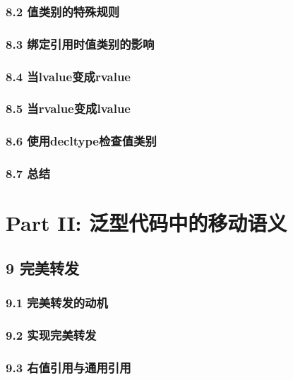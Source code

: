 \documentclass[11pt,a4paper,UTF8]{ctexart}
\begin{document}
		\subsubsection{8.2 值类别的特殊规则}
		
		\subsubsection{8.3 绑定引用时值类别的影响}
		
		\subsubsection{8.4 当lvalue变成rvalue}
		
		\subsubsection{8.5 当rvalue变成lvalue}
		
		\subsubsection{8.6 使用decltype检查值类别}
		
		\subsubsection{8.7 总结}
		
		
	\section{Part II: 泛型代码中的移动语义}
	
	\subsection{9 完美转发}
	
		\subsubsection{9.1 完美转发的动机}
		
		\subsubsection{9.2 实现完美转发}
		
		\subsubsection{9.3 右值引用与通用引用}
		
\end{document}
